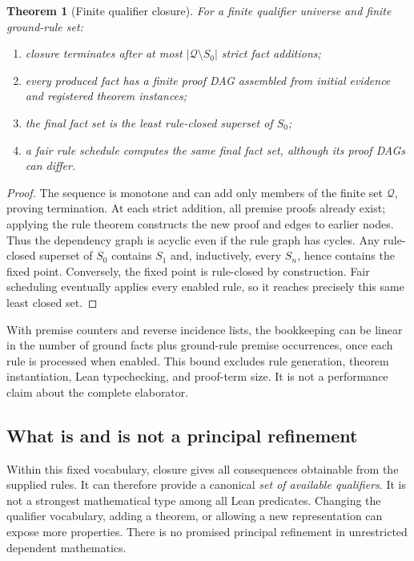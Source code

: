 \documentclass[11pt,a4paper]{article}
\newtheorem{theorem}{Theorem}[section]
\theoremstyle{definition}
\theoremstyle{remark}
\begin{document}
\begin{theorem}[Finite qualifier closure]
\label{thm:closure}
For a finite qualifier universe and finite ground-rule set:
\begin{enumerate}
\item closure terminates after at most $|\mathcal Q\setminus S_0|$ strict fact additions;
\item every produced fact has a finite proof DAG assembled from initial evidence and registered theorem instances;
\item the final fact set is the least rule-closed superset of $S_0$;
\item a fair rule schedule computes the same final fact set, although its proof DAGs can differ.
\end{enumerate}
\end{theorem}
\begin{proof}
The sequence is monotone and can add only members of the finite set $\mathcal Q$, proving termination. At each strict addition, all premise proofs already exist; applying the rule theorem constructs the new proof and edges to earlier nodes. Thus the dependency graph is acyclic even if the rule graph has cycles. Any rule-closed superset of $S_0$ contains $S_1$ and, inductively, every $S_n$, hence contains the fixed point. Conversely, the fixed point is rule-closed by construction. Fair scheduling eventually applies every enabled rule, so it reaches precisely this same least closed set.
\end{proof}

With premise counters and reverse incidence lists, the bookkeeping can be linear in the number of ground facts plus ground-rule premise occurrences, once each rule is processed when enabled. This bound excludes rule generation, theorem instantiation, Lean typechecking, and proof-term size. It is not a performance claim about the complete elaborator.

\subsection{What is and is not a principal refinement}
Within this fixed vocabulary, closure gives all consequences obtainable from the supplied rules. It can therefore provide a canonical \emph{set of available qualifiers}. It is not a strongest mathematical type among all Lean predicates. Changing the qualifier vocabulary, adding a theorem, or allowing a new representation can expose more properties. There is no promised principal refinement in unrestricted dependent mathematics.
\end{document}
